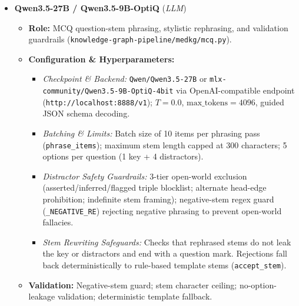{\begin{itemize}
    \item \textbf{Qwen3.5-27B / Qwen3.5-9B-OptiQ} (\textit{LLM})
    \begin{itemize}
        \item \textbf{Role:} MCQ question-stem phrasing, stylistic rephrasing, and validation guardrails (\texttt{knowledge-graph-pipeline/medkg/mcq.py}).
        \item \textbf{Configuration \& Hyperparameters:}
        \begin{itemize}[itemsep=1pt,topsep=1pt]
            \item \textit{Checkpoint \& Backend:} \texttt{Qwen/Qwen3.5-27B} or \texttt{mlx-community/Qwen3.5-9B-OptiQ-4bit} via OpenAI-compatible endpoint (\texttt{http://localhost:8888/v1}); $T = 0.0$, $\text{max\_tokens} = 4096$, guided JSON schema decoding.
            \item \textit{Batching \& Limits:} Batch size of 10 items per phrasing pass (\texttt{phrase\_items}); maximum stem length capped at 300 characters; 5 options per question (1 key + 4 distractors).
            \item \textit{Distractor Safety Guardrails:} 3-tier open-world exclusion (asserted/inferred/flagged triple blocklist; alternate head-edge prohibition; indefinite stem framing); negative-stem regex guard (\texttt{\_NEGATIVE\_RE}) rejecting negative phrasing to prevent open-world fallacies.
            \item \textit{Stem Rewriting Safeguards:} Checks that rephrased stems do not leak the key or distractors and end with a question mark. Rejections fall back deterministically to rule-based template stems (\texttt{accept\_stem}).
        \end{itemize}
        \item \textbf{Validation:} Negative-stem guard; stem character ceiling; no-option-leakage validation; deterministic template fallback.
    \end{itemize}


\end{itemize}}
